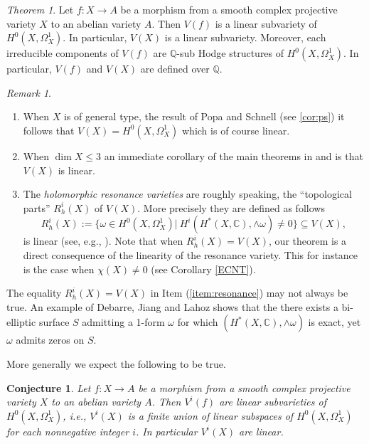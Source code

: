 \documentclass[a4paper,12pt,reqno]{amsart}
\theoremstyle{plain}
\newtheorem{conjecture}[theorem]{Conjecture}
\theoremstyle{remark}
\newtheorem{remark}[theorem]{Remark}
\newcommand{\Q}{\mathbb Q}
\newtheorem{alphtheorem}{Theorem}
\begin{document}
\begin{alphtheorem}\label{main1}
Let $f: X\to A$ be a morphism from a smooth complex projective variety $X$ to an abelian variety $A$. Then 
$V(f)$ is a linear subvariety of $H^0(X, \Omega_X^1)$. In particular, $V(X)$ is a linear subvariety. Moreover, each irreducible components of $V(f)$ are $\Q$-sub Hodge structures of $H^0(X, \Omega_X^1)$. In particular, $V(f)$ and $V(X)$ are defined over $\Q$.

\end{alphtheorem}
\begin{remark}
\begin{enumerate}
	\item When $X$ is of general type, the 
	result of Popa and Schnell (see \ref{cor:ps}) 
	it follows that $V(X) = H^0(X,\Omega_X^1)$ which is of course
	linear. 
	\item  When $\dim X\leq 3$ an immediate corollary of the main theorems in \cite{SS19} and \cite{HS19} is that $V(X)$ is linear.
	\item \label{item:resonance} The \emph{holomorphic resonance varieties} are roughly speaking, the ``topological parts'' $R_h^i(X)$ of $V(X)$.
	More precisely they are defined as follows
	\[R_h^i(X):=\{\omega\in H^0(X, \Omega_X^1)|\ H^i(H^*(X, \mathbb{C}), \wedge \omega)\not= 0\}\subseteq V(X),\]
	is linear (see, e.g., \cite{DiPa13}). Note that
	when
	$R_h^i(X) = V(X)$, our 	theorem is a direct consequence of
	the linearity of the resonance variety. This 
	for instance is the case when $\chi(X)\not=0$ (see Corollary \ref{ECNT}). 
\end{enumerate}

\end{remark}
The equality $R_h^i(X) = V(X)$ in Item (\ref{item:resonance}) may not always be true. An example of Debarre, Jiang and Lahoz 
\cite[Example 1.11]{DJL17} shows that the
there exists a bi-elliptic surface $S$ admitting a 1-form 
$\omega$ for which $(H^*(X, \mathbb{C}), \wedge \omega)$
is exact, yet $\omega$ admits zeros on $S$. 

More generally we expect the following to be true.
\begin{conjecture} \label{linear-vi}
Let $f: X\to A$ be a morphism from a smooth complex projective variety $X$ to an abelian variety $A$. Then $V^i(f)$ are linear subvarieties of $H^0(X, \Omega_X^1)$, i.e., $V^i(X)$ is a finite union of linear subspaces of $H^0(X, \Omega_X^1)$ for each nonnegative integer $i$. In particular $V^i(X)$ are linear.
\end{conjecture}
\end{document}
